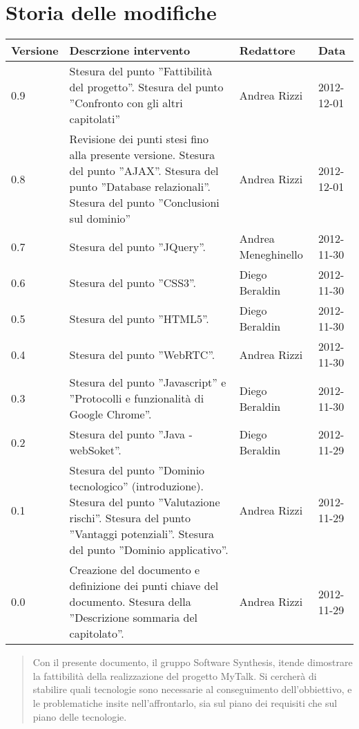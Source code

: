 \section*{Storia delle modifiche}
\begin{tabularx}{\textwidth}{lXll}
\toprule
Versione & Descrzione intervento & Redattore & Data\\
\midrule %
0.9 & Stesura del punto ''Fattibilità del progetto''. Stesura del punto ''Confronto con gli altri capitolati'' & Andrea Rizzi & 2012-12-01\\
0.8 & Revisione dei punti stesi fino alla presente versione. Stesura del punto ''AJAX''. Stesura del punto ''Database relazionali''. Stesura del punto ''Conclusioni sul dominio'' & Andrea Rizzi & 2012-12-01\\
0.7 & Stesura del punto ''JQuery''. & Andrea Meneghinello & 2012-11-30\\
0.6 & Stesura del punto ''CSS3''. & Diego Beraldin & 2012-11-30\\
0.5 & Stesura del punto ''HTML5''. & Diego Beraldin & 2012-11-30\\
0.4 & Stesura del punto ''WebRTC''. & Andrea Rizzi & 2012-11-30\\
0.3 & Stesura del punto ''Javascript'' e ''Protocolli e funzionalità di Google Chrome''.  & Diego Beraldin & 2012-11-30\\
0.2 & Stesura del punto ''Java - webSoket''.  & Diego Beraldin & 2012-11-29\\
0.1 & Stesura del punto ''Dominio tecnologico'' (introduzione). Stesura del punto ''Valutazione rischi''. Stesura del punto ''Vantaggi potenziali''. Stesura del punto ''Dominio applicativo''.  & Andrea Rizzi & 2012-11-29\\
0.0 & Creazione del documento e definizione dei punti chiave del documento. Stesura della ''Descrizione sommaria del capitolato''. & Andrea Rizzi & 2012-11-29\\
\bottomrule
\end{tabularx}
\newpage



\setcounter{page}{1}
\pagestyle{normal}


\begin{abstract}
Con il presente documento, il gruppo Software Synthesis, itende dimostrare la fattibilità della realizzazione del progetto MyTalk. Si cercherà di stabilire quali tecnologie sono necessarie al conseguimento dell'obbiettivo, e le problematiche insite nell'affrontarlo, sia sul piano dei requisiti che sul piano delle tecnologie.
\end{abstract}
\newpage

